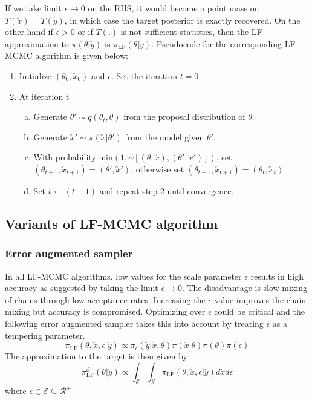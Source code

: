 \begin{multicols}{2}
If we take limit $\epsilon\rightarrow 0$ on the RHS, it would become a point mass on $T(\utilde{x})=T(\utilde{y})$, in which case the target posterior is exactly recovered. On the other hand if $\epsilon>0$ or if $T(.)$ is not sufficient statistics, then the LF approximation to $\pi(\theta|\utilde{y})$ is $\pi_{\text{LF}}(\theta|\utilde{y})$. Pseudocode for the corresponding LF-MCMC algorithm is given below:
\begin{enumerate}
\item Initialize $(\theta_0,\utilde{x}_0)$ and $\epsilon$. Set the iteration $t=0$.
\item At iteration t
\begin{enumerate}[(a)]
\item Generate $\theta'\sim q(\theta_t,\theta)$ from the proposal distribution of $\theta$.
\item Generate $\utilde{x}'\sim \pi(\utilde{x}|\theta')$ from the model given $\theta'$. 
\item With probability $\text{min}(1,\alpha[(\theta,\utilde{x}),(\theta',\utilde{x}')])$, set $(\theta_{t+1},\utilde{x}_{t+1})=(\theta',\utilde{x}')$, otherwise set $(\theta_{t+1},\utilde{x}_{t+1})=(\theta_{t},\utilde{x}_{t})$.
\item Set $t\leftarrow (t+1)$ and repeat step 2 until convergence.
\end{enumerate}
\end{enumerate}

\subsection{Variants of LF-MCMC algorithm}
\subsubsection{Error augmented sampler}
In all LF-MCMC algorithms, low values for the scale parameter $\epsilon$ results in high accuracy as suggested by taking the limit $\epsilon \rightarrow 0$. The disadvantage is slow mixing of chains through low acceptance rates. Increasing the $\epsilon$ value improves the chain mixing but accuracy is compromised. Optimizing over $\epsilon$ could be critical and the following error augmented sampler\cite{bortot2007inference} takes this into account by treating $\epsilon$ as a tempering parameter.
\begin{equation}
\pi_{\text{LF}}(\theta,\utilde{x},\epsilon|\utilde{y})\propto \pi_{\epsilon}(\utilde{y}|\utilde{x},\theta)\pi(\utilde{x}|\theta)\pi(\theta)\pi(\epsilon)
\end{equation}
The approximation to the target is then given by 
\begin{equation}
\pi_{\text{LF}}^{\mathcal{E}}(\theta|\utilde{y})\propto \int_{\mathcal{E}}\int_{\mathcal{Y}}\pi_{\text{LF}}(\theta,\utilde{x},\epsilon|\utilde{y})d\utilde{x}d\epsilon
\end{equation}
where $\epsilon \in \mathcal{E} \subseteq \mathcal{R}^+$


\end{multicols}
